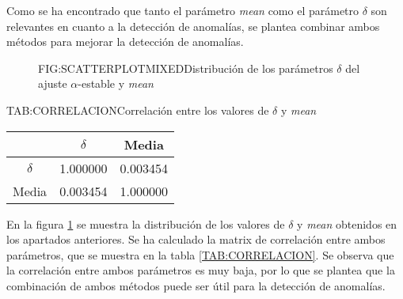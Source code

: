 Como se ha encontrado que tanto el parámetro \textit{mean} como el parámetro $\delta$ son relevantes en cuanto a la detección de anomalías, se plantea combinar ambos métodos para mejorar la detección de anomalías.

\begin{figure}[Distribución de los parámetros $\delta$ del ajuste $\alpha$-estable y \textit{mean}]{FIG:SCATTERPLOTMIXED}{Distribución de los parámetros $\delta$ del ajuste $\alpha$-estable y \textit{mean}}
    \label{FIG:SCATTERPLOTMIXED}
\end{figure}


\begin{table}[Correlación entre los valores de $\delta$ y \textit{mean}]{TAB:CORRELACION}{Correlación entre los valores de $\delta$ y \textit{mean}}
    \begin{tabular}{|c|c|c|}
        \hline
        & $\delta$ & Media \\
        \hline
        $\delta$ & 1.000000 & 0.003454 \\
        Media & 0.003454 & 1.000000 \\
        \hline
    \end{tabular}
\end{table}

En la figura \ref{FIG:SCATTERPLOTMIXED} se muestra la distribución de los valores de $\delta$ y \textit{mean} obtenidos en los apartados anteriores. Se ha calculado la matrix de correlación entre ambos parámetros, que se muestra en la tabla \ref{TAB:CORRELACION}. Se observa que la correlación entre ambos parámetros es muy baja, por lo que se plantea que la combinación de ambos métodos puede ser útil para la detección de anomalías.